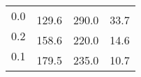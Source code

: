 \documentclass[11pt]{article}
\begin{document}
\begin{table}
\begin{tabular}{|c|c|c|c|}
\multirow{2}{*}{0.0} & & & \\ \cline{2-4} 
 & \multirow{2}{*}{129.6} & \multirow{2}{*}{290.0} & \multirow{2}{*}{33.7} \\ \cline{1-1}
\multirow{2}{*}{0.2} & & & \\ \cline{2-4} 
 & \multirow{2}{*}{158.6} & \multirow{2}{*}{220.0} & \multirow{2}{*}{14.6} \\ \cline{1-1}
\multirow{2}{*}{0.1} & & & \\ \cline{2-4} 
 & \multirow{2}{*}{179.5} & \multirow{2}{*}{235.0} & \multirow{2}{*}{10.7} \\ \cline{1-1}
 & & & \\ \hline
\end{tabular}
\end{table}
\end{document}
